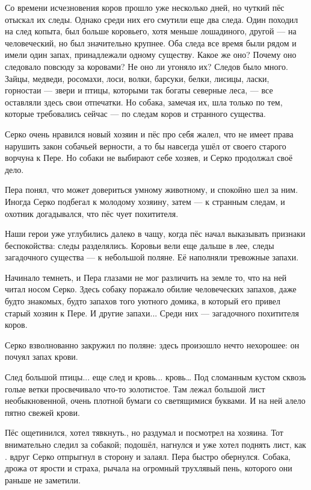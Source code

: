 \documentclass[oneside,final,14pt]{extreport}
\begin{document}
	Со времени исчезновения коров прошло уже несколько дней, но чуткий пёс отыскал их следы. Однако среди них его смутили еще два следа. Один походил на след копыта, был больше коровьего, хотя меньше лошадиного, другой — на человеческий, но был значительно крупнее. Оба следа все время были рядом и имели один запах, принадлежали одному существу. Какое же оно? Почему оно следовало повсюду за коровами? Не оно ли угоняло их? Следов было много. Зайцы, медведи, росомахи, лоси, волки, барсуки, белки, лисицы, ласки, горностаи — звери и птицы, которыми так богаты северные леса, — все оставляли здесь свои отпечатки. Но собака, замечая их, шла только по тем, которые требовались сейчас — по следам коров и странного существа.
	
	Серко очень нравился новый хозяин и пёс про себя жалел, что не имеет права нарушить закон собачьей верности, а то бы навсегда ушёл от своего старого ворчуна к Пере. Но собаки не выбирают себе хозяев, и Серко продолжал своё дело.
	
	Пера понял, что может довериться умному животному, и спокойно шел за ним. Иногда Серко подбегал к молодому хозяину, затем — к странным следам, и охотник догадывался, что пёс чует похитителя.
	
	Наши герои уже углубились далеко в чащу, когда пёс начал выказывать признаки беспокойства: следы разделялись. Коровьи вели еще дальше в лее, следы загадочного существа — к небольшой поляне. Её наполняли тревожные запахи.
	
	Начинало темнеть, и Пера глазами не мог различить на земле то, что на ней читал носом Серко. Здесь собаку поражало обилие человеческих запахов, даже будто знакомых, будто запахов того уютного домика, в который его привел старый хозяин к Пере. И другие запахи... Среди них — загадочного похитителя коров.
	
	Серко взволнованно закружил по поляне: здесь произошло нечто нехорошее: он почуял запах крови.
	
	След большой птицы... еще след и кровь... кровь… Под сломанным кустом сквозь голые ветки просвечивало что-то золотистое. Там лежал большой лист необыкновенной, очень плотной бумаги со светящимися буквами. И на ней алело пятно свежей крови.
	
	Пёс ощетинился, хотел тявкнуть., но раздумал и посмотрел на хозяина. Тот внимательно следил за собакой; подошёл, нагнулся и уже хотел поднять лист, как . вдруг Серко отпрыгнул в сторону и залаял. Пера быстро обернулся. Собака, дрожа от ярости и страха, рычала на огромный трухлявый пень, которого они раньше не заметили.
	
\end{document}
